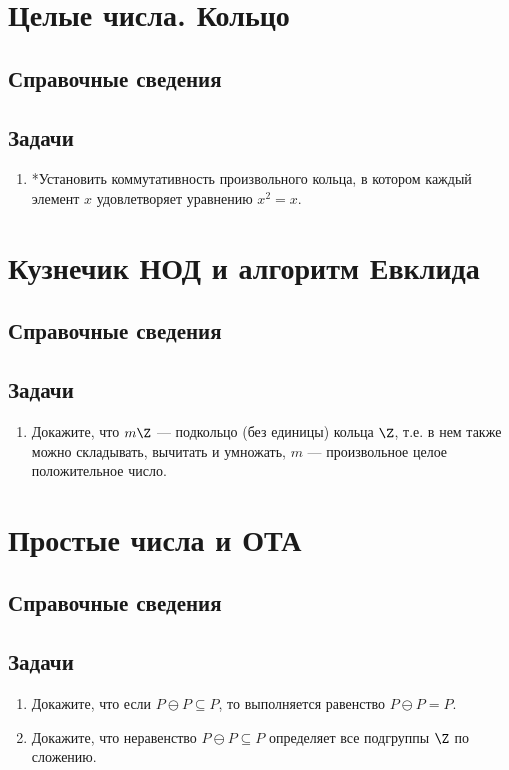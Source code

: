 


\section{Целые числа. Кольцо}

\subsection*{Справочные сведения}

\subsection*{Задачи}
\begin{enumerate}
\item *Установить коммутативность произвольного кольца, в котором каждый элемент $x$ удовлетворяет уравнению $x^2=x$.
\end{enumerate}

\section{Кузнечик НОД и алгоритм Евклида}

\subsection*{Справочные сведения}

\subsection*{Задачи}
\begin{enumerate}
\item Докажите, что $m\Z$ --- подкольцо (без единицы) кольца $\Z$, т.е. в нем также можно складывать, вычитать и умножать, $m$ --- произвольное целое положительное число.
\end{enumerate}


\section{Простые числа и ОТА}\label{PrimeNumbers}

\subsection*{Справочные сведения}

\subsection*{Задачи}
\begin{enumerate}

\item Докажите, что если $P\ominus P\subseteq P$, то выполняется равенство $P\ominus P=P$.
\item Докажите, что неравенство $P\ominus P\subseteq P$ определяет все подгруппы $\Z$ по сложению.

\end{enumerate}


